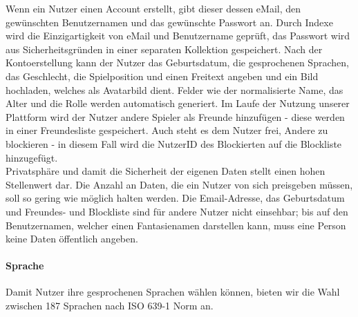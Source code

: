 Wenn ein Nutzer einen Account erstellt, gibt dieser dessen eMail, den gewünschten Benutzernamen und das gewünschte Passwort an. Durch Indexe wird die Einzigartigkeit von eMail und Benutzername geprüft, das Passwort wird aus Sicherheitsgründen in einer separaten Kollektion gespeichert. Nach der Kontoerstellung kann der Nutzer das Geburtsdatum, die gesprochenen Sprachen, das Geschlecht, die Spielposition und einen Freitext angeben und ein Bild hochladen, welches als Avatarbild dient. Felder wie der normalisierte Name, das Alter und die Rolle werden automatisch generiert. Im Laufe der Nutzung unserer Plattform wird der Nutzer andere Spieler als Freunde hinzufügen - diese werden in einer Freundesliste gespeichert. Auch steht es dem Nutzer frei, Andere zu blockieren - in diesem Fall wird die NutzerID des Blockierten auf die Blockliste hinzugefügt. \\
Privatsphäre und damit die Sicherheit der eigenen Daten stellt einen hohen Stellenwert dar. Die Anzahl an Daten, die ein Nutzer von sich preisgeben müssen, soll so gering wie möglich halten werden. Die Email-Adresse, das Geburtsdatum und Freundes- und Blockliste sind für andere Nutzer nicht einsehbar; bis auf den Benutzernamen, welcher einen Fantasienamen darstellen kann, muss eine Person keine Daten öffentlich angeben.

\paragraph{Sprache\\}
Damit Nutzer ihre gesprochenen Sprachen wählen können, bieten wir die Wahl zwischen 187 Sprachen nach ISO 639-1 Norm an.\cite{ISO639-1}\\

